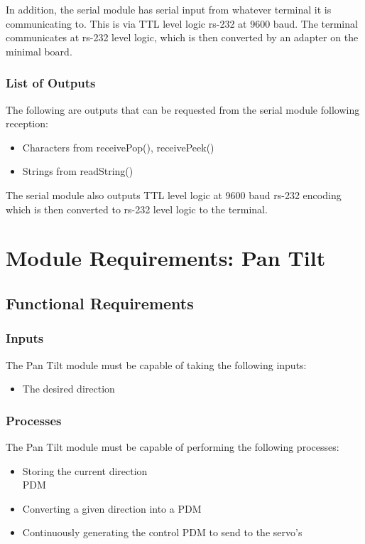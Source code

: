 \documentclass[]{report}
\begin{document}
In addition, the serial module has serial input from whatever terminal it is communicating to. This is via TTL level logic rs-232 at 9600 baud. The terminal communicates at rs-232 level logic, which is then converted by an adapter on the minimal board.

\subsubsection{List of Outputs}
The following are outputs that can be requested from the serial module following reception:
\begin{itemize}
	\item Characters from receivePop(), receivePeek()
	\item Strings from readString()
\end{itemize}

The serial module also outputs TTL level logic at 9600 baud rs-232 encoding which is then converted to rs-232 level logic to the terminal.



\section{Module Requirements: Pan Tilt}

\subsection{Functional Requirements}
\subsubsection{Inputs}
The Pan Tilt module must be capable of taking the following inputs:
\begin{itemize}
	\item The desired direction
\end{itemize}

\subsubsection{Processes}
The Pan Tilt module must be capable of performing the following processes:
\begin{itemize}
	\item Storing the current direction\\PDM
	\item Converting a given direction into a PDM
	\item Continuously generating the control PDM to send to the servo's
\end{itemize}
\end{document}
